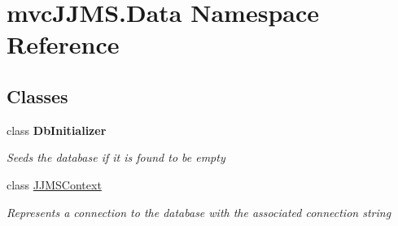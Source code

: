 \hypertarget{namespacemvc_j_j_m_s_1_1_data}{}\section{mvc\+J\+J\+M\+S.\+Data Namespace Reference}
\label{namespacemvc_j_j_m_s_1_1_data}
\subsection*{Classes}
\begin{DoxyCompactItemize}
\item 
class {\bfseries Db\+Initializer}
\begin{DoxyCompactList}\small\item\em Seeds the database if it is found to be empty \end{DoxyCompactList}\item 
class \mbox{\hyperlink{classmvc_j_j_m_s_1_1_data_1_1_j_j_m_s_context}{J\+J\+M\+S\+Context}}
\begin{DoxyCompactList}\small\item\em Represents a connection to the database with the associated connection string \end{DoxyCompactList}\end{DoxyCompactItemize}
